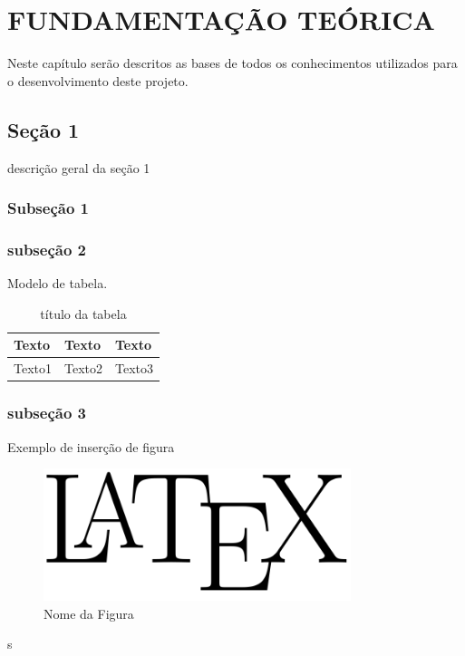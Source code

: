 \chapter{FUNDAMENTAÇÃO TEÓRICA}\label{fund}
Neste capítulo serão descritos as bases de todos os conhecimentos utilizados para o desenvolvimento deste projeto.
\section{Seção 1}\label{label1}

descrição geral da seção 1

\subsection{Subseção 1}\label{labelS1}


\subsection{subseção 2}

Modelo de tabela.

\begin{table}[htbp!]
  \centering
    \caption{título da tabela}
      \begin{tabularx}{\textwidth}{|X|X|X|}
      \hline
      \textbf{Texto} &  \textbf{Texto} & \textbf{Texto} \\
      \hline
      Texto1 & Texto2 & Texto3 \\
      \hline
      \end{tabularx}
  \label{Tabela1}
\end{table}

\subsection{subseção 3}\label{labels3}
Exemplo de inserção de figura

\begin{figure}[htp!]
\centering
\includegraphics[width=0.80\textwidth]{figuras/latex.png}
\caption{Nome da Figura}
\label{figura1}
\end{figure}
\pagebreak
s


